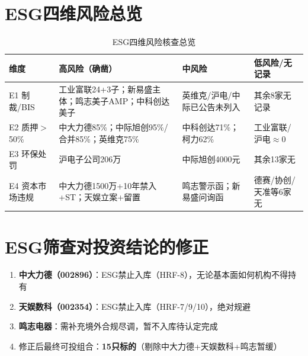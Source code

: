 \section{ESG四维风险总览}

\begin{table}[H]
\centering\scriptsize
\renewcommand{\arraystretch}{1.15}
\begin{tabularx}{\textwidth}{l X X X}
\toprule
\textbf{维度} & \textbf{高风险（确凿）} & \textbf{中风险} & \textbf{低风险/无记录} \\
\midrule
E1 制裁/BIS & \textcolor{riskred}{工业富联}24+3子；\textcolor{riskred}{新易盛}主体；\textcolor{riskred}{鸣志}美子AMP；中科创达美子 & 英维克/沪电/中际已公告未列入 & 其余8家无记录 \\
E2 质押$>$50\% & \textcolor{riskred}{中大力德}85\%；\textcolor{riskred}{中际旭创}95\%/合并85\%；英维克75\% & 中科创达71\%；柯力62\% & 工业富联/沪电$\approx$0 \\
E3 环保处罚 & 沪电子公司206万 & 中际旭创4000元 & 其余13家无 \\
E4 资本市场违规 & \textcolor{riskred}{中大力德}1500万+10年禁入+ST；\textcolor{riskred}{天娱}立案+留置 & 鸣志警示函；新易盛问询函 & 德赛/协创/天准等6家无 \\
\bottomrule
\end{tabularx}
\caption{ESG四维风险核查总览}
\end{table}

\section{ESG筛查对投资结论的修正}

\begin{enumerate}
  \item \textbf{中大力德（002896）}：ESG禁止入库（HRF-8），无论基本面如何机构不得持有
  \item \textbf{天娱数科（002354）}：ESG禁止入库（HRF-7/9/10），绝对规避
  \item \textbf{鸣志电器}：需补充境外合规尽调，暂不入库待认定完成
  \item 修正后最终可投组合：\textbf{15只标的}（剔除中大力德+天娱数科+鸣志暂缓）
\end{enumerate}
